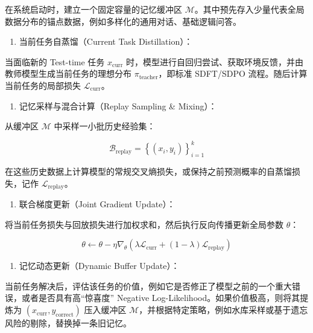 在系统启动时，建立一个固定容量的记忆缓冲区 \(\mathcal{M}\)。其中预先存入少量代表全局数据分布的锚点数据，例如多样化的通用对话、基础逻辑问答。

\begin{enumerate}
\def\labelenumi{\arabic{enumi}.}
\setcounter{enumi}{1}
\tightlist
\item
  当前任务自蒸馏（Current Task Distillation）：
\end{enumerate}

当面临新的 Test-time 任务 \(x_{\mathrm{curr}}\) 时，模型进行自回归尝试、获取环境反馈，并由教师模型生成当前任务的理想分布 \(\pi_{\mathrm{teacher}}\)，即标准 SDFT/SDPO 流程。随后计算当前任务的局部损失 \(\mathcal{L}_{\mathrm{curr}}\)。

\begin{enumerate}
\def\labelenumi{\arabic{enumi}.}
\setcounter{enumi}{2}
\tightlist
\item
  记忆采样与混合计算（Replay Sampling \& Mixing）：
\end{enumerate}

从缓冲区 \(\mathcal{M}\) 中采样一小批历史经验集：

\[
\mathcal{B}_{\mathrm{replay}} = \left\{(x_i, y_i)\right\}_{i=1}^{k}
\]

在这些历史数据上计算模型的常规交叉熵损失，或保持之前预测概率的自蒸馏损失，记作 \(\mathcal{L}_{\mathrm{replay}}\)。

\begin{enumerate}
\def\labelenumi{\arabic{enumi}.}
\setcounter{enumi}{3}
\tightlist
\item
  联合梯度更新（Joint Gradient Update）：
\end{enumerate}

将当前任务损失与回放损失进行加权求和，然后执行反向传播更新全局参数 \(\theta\)：

\[
\theta \leftarrow \theta - \eta \nabla_\theta\left(\lambda \mathcal{L}_{\mathrm{curr}} + (1-\lambda)\mathcal{L}_{\mathrm{replay}}\right)
\]

\begin{enumerate}
\def\labelenumi{\arabic{enumi}.}
\setcounter{enumi}{4}
\tightlist
\item
  记忆动态更新（Dynamic Buffer Update）：
\end{enumerate}

当前任务解决后，评估该任务的价值，例如它是否修正了模型之前的一个重大错误，或者是否具有高``惊喜度'' Negative Log-Likelihood。如果价值极高，则将其提炼为 \((x_{\mathrm{curr}}, y_{\mathrm{correct}})\) 压入缓冲区 \(\mathcal{M}\)，并根据特定策略，例如水库采样或基于遗忘风险的剔除，替换掉一条旧记忆。

